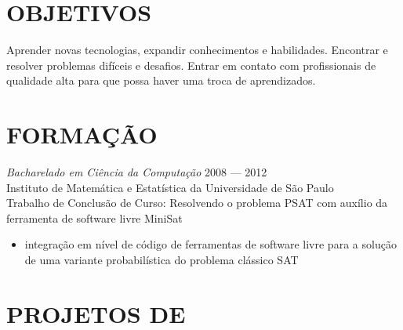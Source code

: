 \documentclass[]{res} %
\newcommand{\sbt}{\,\begin{picture}(-1,1)(-2,-3)\circle*{2}\end{picture}\ }
\def \divspace{6pt}
\def \myitemback{0.55cm}
\def \myitemsep{0pt}
\def \myprojectface{\it}
\def \myorgface{\sc}
\begin{document}
\begin{resume}

 
\section{OBJETIVOS \hspace{\divspace} }

Aprender novas tecnologias, expandir conhecimentos e habilidades. Encontrar e resolver problemas difíceis e desafios. Entrar em contato com profissionais de qualidade alta para que possa haver uma troca de aprendizados.



\section{FORMAÇÃO \hspace{\divspace} }

{\myprojectface Bacharelado em Ciência da Computação} \hfill 2008 — 2012 \\
{\myorgface Instituto de Matemática e Estatística} da {\myorgface Universidade de São Paulo} \\
Trabalho de Conclusão de Curso: Resolvendo o problema PSAT com auxílio da ferramenta de software livre MiniSat
\begin{itemize}[itemsep=\myitemsep,leftmargin=\myitemback]
\item[\sbt] integração em nível de código de ferramentas de software livre para a solução de uma variante probabilística do problema clássico SAT
\end{itemize}



\section{PROJETOS DE \hspace{\divspace} }

\end{resume}
\end{document}
